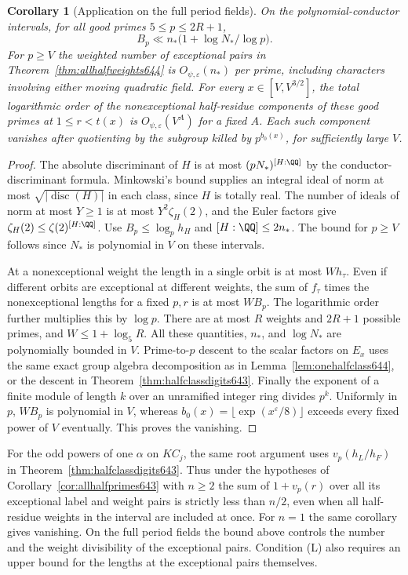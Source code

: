 \documentclass[a4paper,11pt]{article}
\newtheorem{corollary}[proposition]{Corollary}
\theoremstyle{definition}
\theoremstyle{remark}
\numberwithin{equation}{section}
\begin{document}
\begin{corollary}[Application on the full period fields]
\leavevmode\label{cor:periodfieldweights644}
On the polynomial-conductor intervals, for all good primes
\(5\le p\le 2R+1\),
\[
 B_p\ll n_*\bigl(1+\log N_*/\log p\bigr).
\]
For \(p\ge V\) the weighted number of exceptional pairs in
Theorem~\ref{thm:allhalfweights644} is
\(O_{\psi,\varepsilon}(n_*)\) per prime, including characters
involving either moving quadratic field. For every
\(x\in[V,V^{3/2}]\), the total logarithmic order of the
nonexceptional half-residue components of these good primes
at \(1\le r<t(x)\) is \(O_{\psi,\varepsilon}(V^A)\) for a
fixed \(A\). Each such component vanishes after quotienting
by the subgroup killed by \(p^{b_0(x)}\), for sufficiently
large \(V\).
\end{corollary}
\begin{proof}
The absolute discriminant of \(H\) is at most
\((pN_*)^{[H:\QQ]}\) by the conductor-discriminant formula.
Minkowski's bound supplies an integral ideal of norm at most
\(\sqrt{|\operatorname{disc}(H)|}\) in each class, since \(H\)
is totally real. The number of ideals of norm at most \(Y\ge1\)
is at most \(Y^2\zeta_H(2)\), and the Euler factors give
\(\zeta_H(2)\le\zeta(2)^{[H:\QQ]}\).
Use \(B_p\le\log_p h_H\) and \([H:\QQ]\le2n_*\).
The bound for \(p\ge V\) follows since \(N_*\) is polynomial
in \(V\) on these intervals.

At a nonexceptional weight the length in a single orbit is
at most \(Wh_\tau\). Even if different orbits are exceptional
at different weights, the sum of \(f_\tau\) times the
nonexceptional lengths for a fixed \(p,r\) is at most \(WB_p\).
The logarithmic order further multiplies this by \(\log p\).
There are at most \(R\) weights and \(2R+1\) possible primes,
and \(W\le1+\log_5 R\). All these quantities, \(n_*\), and
\(\log N_*\) are polynomially bounded in \(V\). Prime-to-\(p\)
descent to the scalar factors on \(E_x\) uses the same exact
group algebra decomposition as in Lemma~\ref{lem:onehalfclass644},
or the descent in Theorem~\ref{thm:halfclassdigits643}.
Finally the exponent of a finite module of length \(k\) over
an unramified integer ring divides \(p^k\). Uniformly in \(p\),
\(WB_p\) is polynomial in \(V\), whereas
\(b_0(x)=\lfloor\exp(x^\varepsilon/8)\rfloor\) exceeds every
fixed power of \(V\) eventually. This proves the vanishing.
\end{proof}

For the odd powers of one \(\alpha\) on \(K C_j\), the same root
argument uses \(v_p(h_L/h_F)\) in Theorem~\ref{thm:halfclassdigits643}.
Thus under the hypotheses of Corollary~\ref{cor:allhalfprimes643}
with \(n\ge2\) the sum of \(1+v_p(r)\) over all its exceptional
label and weight pairs is strictly less than \(n/2\), even when
all half-residue weights in the interval are included at once.
For \(n=1\) the same corollary gives vanishing. On the full
period fields the bound above controls the number and the
weight divisibility of the exceptional pairs. Condition
\textup{(L)} also requires an upper bound for the lengths
at the exceptional pairs themselves.
\end{document}
